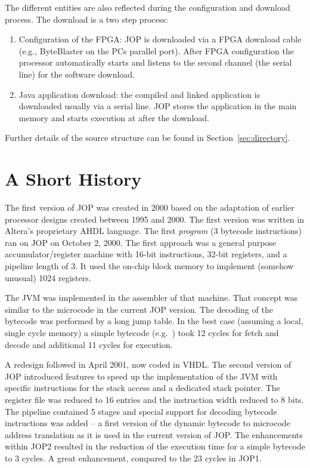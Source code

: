 The different entities are also reflected during the configuration
and download process. The download is a two step process:
\begin{enumerate}
    \item Configuration of the FPGA: JOP is downloaded via a FPGA
        download cable (e.g., ByteBlaster on the PCs parallel
        port). After FPGA configuration the processor
        automatically starts and listens to the second channel
        (the serial line) for the software download.
    \item Java application download: the compiled and linked
    application is downloaded usually via a serial line. JOP stores
    the application in the main memory and starts execution at
     after the download.
\end{enumerate}

Further details of the source structure can be found in
Section~\ref{sec:directory}.

\section{A Short History}

The first version of JOP was created in 2000 based on the adaptation
of earlier processor designs created between 1995 and 2000. The first
version was written in Altera's proprietary AHDL language. The first
\emph{program} (3 bytecode instructions) ran on JOP on October 2,
2000. The first approach was a general purpose accumulator/register
machine with 16-bit instructions, 32-bit registers, and a pipeline
length of 3. It used the on-chip block memory to implement (somehow
unusual) 1024 registers.

The JVM was implemented in the assembler of that machine. That
concept was similar to the microcode in the current JOP version. The
decoding of the bytecode was performed by a long jump table. In the
best case (assuming a local, single cycle memory) a simple bytecode
(e.g.\ ) took 12 cycles for fetch and decode and
additional 11 cycles for execution.


A redesign followed in April 2001, now coded in VHDL. The second
version of JOP introduced features to speed up the implementation of
the JVM with specific instructions for the stack access and a
dedicated stack pointer. The register file was reduced to 16 entries
and the instruction width reduced to 8 bits. The pipeline contained 5
stages and special support for decoding bytecode instructions was
added -- a first version of the dynamic bytecode to microcode address
translation as it is used in the current version of JOP. The
enhancements within JOP2 resulted in the reduction of the execution
time for a simple bytecode to 3 cycles. A great enhancement, compared
to the 23 cycles in JOP1.

